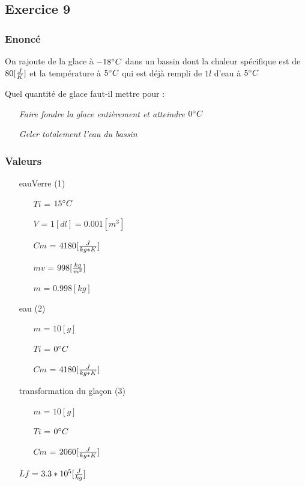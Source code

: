 
\subsection{Exercice 9}
\subsubsection{Enoncé}

On rajoute de la glace à $-18\celsius$ dans un bassin dont la chaleur spécifique est de $80[\cs]$ et la température à $5\celsius$ qui est déjà rempli de $1l$ d'eau à $5\celsius$

Quel quantité de glace faut-il mettre pour :
\begin{itemize}
    \item[\textit{Faire fondre la glace entièrement et atteindre $0\celsius$}]
    \item[\textit{Geler totalement l'eau du bassin}]
\end{itemize}
\subsubsection{Valeurs}
\begin{itemize}
    \item[eauVerre] (1)
    \item[] 
    \begin{itemize}
        \item[$Ti$] = $15\celsius$
        \item[$V$] = $1[dl] = 0.001[m^3]$
        \item[$Cm$] = $4180[\cm]$
        \item[$mv$] = $998[\mv]$ 
        \item[$m$] = $0.998[kg]$ 
    \end{itemize}
    \item[eau] (2)
    \item[] 
    \begin{itemize}
        \item[$m$] = $10[g]$
        \item[$Ti$] = $0\celsius$
        \item[$Cm$] = $4180[\cm]$
    \end{itemize}
    \item[transformation du glaçon] (3)
    \item[] 
    \begin{itemize}
        \item[$m$] = $10[g]$
        \item[$Ti$] = $0\celsius$
        \item[$Cm$] = $2060[\cm]$
    \end{itemize}
    \item[$Lf$] = $3.3*10^5[\lf]$
\end{itemize}
